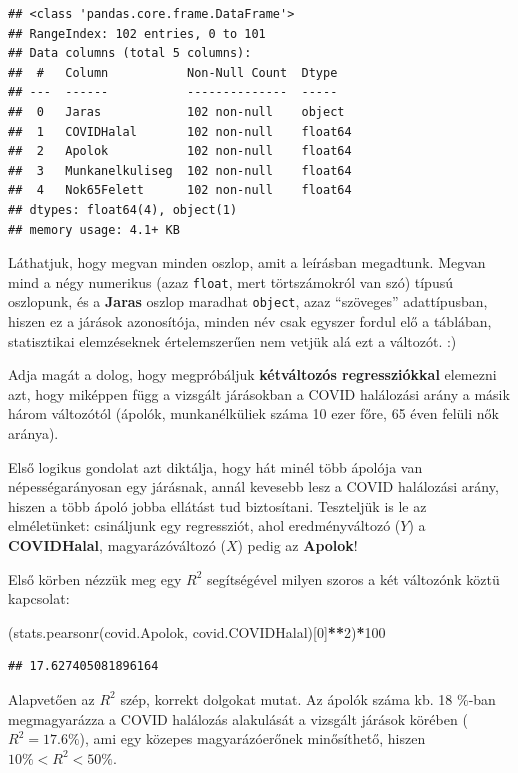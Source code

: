\documentclass[
]{book}
\newenvironment{Shaded}{\begin{snugshade}}{\end{snugshade}}
\newcommand{\DecValTok}[1]{\textcolor[rgb]{0.00,0.00,0.81}{#1}}
\newcommand{\NormalTok}[1]{#1}
\newcommand{\OperatorTok}[1]{\textcolor[rgb]{0.81,0.36,0.00}{\textbf{#1}}}
\begin{document}
\begin{verbatim}
## <class 'pandas.core.frame.DataFrame'>
## RangeIndex: 102 entries, 0 to 101
## Data columns (total 5 columns):
##  #   Column           Non-Null Count  Dtype  
## ---  ------           --------------  -----  
##  0   Jaras            102 non-null    object 
##  1   COVIDHalal       102 non-null    float64
##  2   Apolok           102 non-null    float64
##  3   Munkanelkuliseg  102 non-null    float64
##  4   Nok65Felett      102 non-null    float64
## dtypes: float64(4), object(1)
## memory usage: 4.1+ KB
\end{verbatim}

Láthatjuk, hogy megvan minden oszlop, amit a leírásban megadtunk. Megvan mind a négy numerikus (azaz \texttt{float}, mert törtszámokról van szó) típusú oszlopunk, és a \textbf{Jaras} oszlop maradhat \texttt{object}, azaz ``szöveges'' adattípusban, hiszen ez a járások azonosítója, minden név csak egyszer fordul elő a táblában, statisztikai elemzéseknek értelemszerűen nem vetjük alá ezt a változót. :)

Adja magát a dolog, hogy megpróbáljuk \textbf{kétváltozós regressziókkal} elemezni azt, hogy miképpen függ a vizsgált járásokban a COVID halálozási arány a másik három változótól (ápolók, munkanélküliek száma 10 ezer főre, 65 éven felüli nők aránya).

Első logikus gondolat azt diktálja, hogy hát minél több ápolója van népességarányosan egy járásnak, annál kevesebb lesz a COVID halálozási arány, hiszen a több ápoló jobba ellátást tud biztosítani. Teszteljük is le az elméletünket: csináljunk egy regressziót, ahol eredményváltozó (\(Y\)) a \textbf{COVIDHalal}, magyarázóváltozó (\(X\)) pedig az \textbf{Apolok}!

Első körben nézzük meg egy \(R^2\) segítségével milyen szoros a két változónk köztü kapcsolat:

\begin{Shaded}
\begin{Highlighting}[]
\NormalTok{(stats.pearsonr(covid.Apolok, covid.COVIDHalal)[}\DecValTok{0}\NormalTok{]}\OperatorTok{**}\DecValTok{2}\NormalTok{)}\OperatorTok{*}\DecValTok{100}
\end{Highlighting}
\end{Shaded}

\begin{verbatim}
## 17.627405081896164
\end{verbatim}

Alapvetően az \(R^2\) szép, korrekt dolgokat mutat. Az ápolók száma kb. 18 \%-ban megmagyarázza a COVID halálozás alakulását a vizsgált járások körében (\(R^2=17.6\%\)), ami egy közepes magyarázóerőnek minősíthető, hiszen \(10\% < R^2 < 50\%\).
\end{document}
